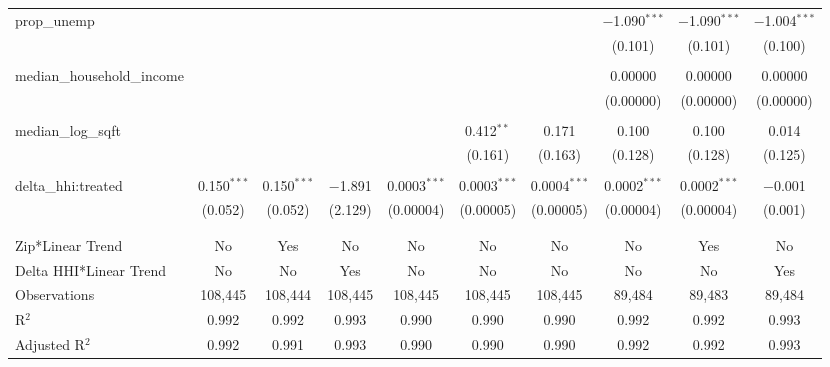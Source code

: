 \begin{table}[H]
{\begin{tabular}{@{\extracolsep{5pt}}lccccccccc}
  prop\_unemp &  &  &  &  &  &  & $-$1.090$^{***}$ & $-$1.090$^{***}$ & $-$1.004$^{***}$ \\  

   &  &  &  &  &  &  & (0.101) & (0.101) & (0.100) \\  

   & & & & & & & & & \\  

  median\_household\_income &  &  &  &  &  &  & 0.00000 & 0.00000 & 0.00000 \\  

   &  &  &  &  &  &  & (0.00000) & (0.00000) & (0.00000) \\  

   & & & & & & & & & \\  

  median\_log\_sqft &  &  &  &  & 0.412$^{**}$ & 0.171 & 0.100 & 0.100 & 0.014 \\  

   &  &  &  &  & (0.161) & (0.163) & (0.128) & (0.128) & (0.125) \\  

   & & & & & & & & & \\  

  delta\_hhi:treated & 0.150$^{***}$ & 0.150$^{***}$ & $-$1.891 & 0.0003$^{***}$ & 0.0003$^{***}$ & 0.0004$^{***}$ & 0.0002$^{***}$ & 0.0002$^{***}$ & $-$0.001 \\  

   & (0.052) & (0.052) & (2.129) & (0.00004) & (0.00005) & (0.00005) & (0.00004) & (0.00004) & (0.001) \\  

   & & & & & & & & & \\  

 \hline \\[-1.8ex]  

 Zip*Linear Trend & No & Yes & No & No & No & No & No & Yes & No \\  

 Delta HHI*Linear Trend & No & No & Yes & No & No & No & No & No & Yes \\  

 Observations & 108,445 & 108,444 & 108,445 & 108,445 & 108,445 & 108,445 & 89,484 & 89,483 & 89,484 \\  

 R$^{2}$ & 0.992 & 0.992 & 0.993 & 0.990 & 0.990 & 0.990 & 0.992 & 0.992 & 0.993 \\  

 Adjusted R$^{2}$ & 0.992 & 0.991 & 0.993 & 0.990 & 0.990 & 0.990 & 0.992 & 0.992 & 0.993 \\  


\end{tabular}}
\end{table}

